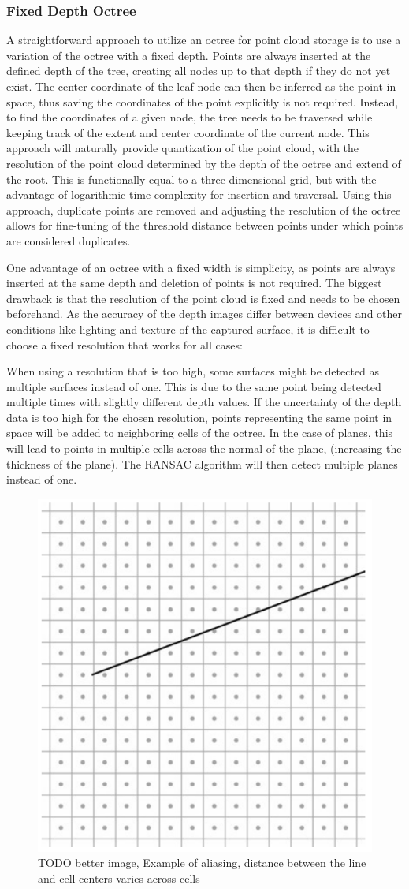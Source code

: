 \subsubsection{Fixed Depth Octree}
A straightforward approach to utilize an octree for point cloud storage is to use a variation of the octree with a fixed depth.
Points are always inserted at the defined depth of the tree, creating all nodes up to that depth if they do not yet exist.
The center coordinate of the leaf node can then be inferred as the point in space,
thus saving the coordinates of the point explicitly is not required.
Instead, to find the coordinates of a given node, the tree needs to be traversed while keeping track of
the extent and center coordinate of the current node.
This approach will naturally provide quantization of the point cloud, with the resolution of the point cloud
determined by the depth of the octree and extend of the root.
This is functionally equal to a three-dimensional grid,
but with the advantage of logarithmic time complexity for insertion and traversal.
Using this approach, duplicate points are removed and adjusting the resolution of the octree
allows for fine-tuning of the threshold distance between points under which points are considered duplicates.

One advantage of an octree with a fixed width is simplicity, as points are always inserted at the same depth and deletion of points is not required.
The biggest drawback is that the resolution of the point cloud is fixed and needs to be chosen beforehand.
As the accuracy of the depth images differ between devices and other conditions like lighting and texture of the captured surface,
it is difficult to choose a fixed resolution that works for all cases:

When using a resolution that is too high, some surfaces might be detected as multiple surfaces instead of one.
This is due to the same point being detected multiple times with slightly different depth values.
If the uncertainty of the depth data is too high for the chosen resolution,
points representing the same point in space will be added to neighboring cells of the octree.
In the case of planes, this will lead to points in multiple cells across the normal of the plane,
(increasing the thickness of the plane).
The RANSAC algorithm will then detect multiple planes instead of one.

\begin{figure}[h!]
    \centering
    \includegraphics[width=0.35\linewidth]{images/aliasing}
    \caption{TODO better image, Example of aliasing, distance between the line and cell centers varies across cells}
    \label{fig:aliasing}
\end{figure}

